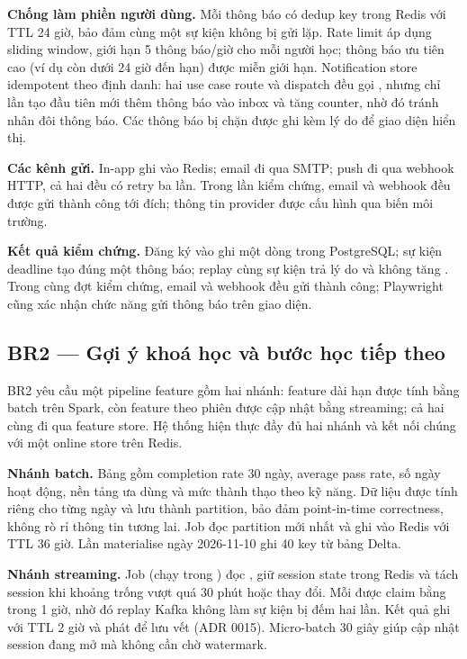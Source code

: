 \textbf{Chống làm phiền người dùng.} Mỗi thông báo có dedup key trong Redis với TTL 24 giờ, bảo đảm cùng một sự kiện không bị gửi lặp. Rate limit áp dụng sliding window, giới hạn 5 thông báo/giờ cho mỗi người học; thông báo ưu tiên cao (ví dụ còn dưới 24 giờ đến hạn) được miễn giới hạn. Notification store idempotent theo định danh: hai use case route và dispatch đều gọi , nhưng chỉ lần tạo đầu tiên mới thêm thông báo vào inbox và tăng counter, nhờ đó tránh nhân đôi thông báo. Các thông báo bị chặn được ghi kèm lý do để giao diện hiển thị.

\textbf{Các kênh gửi.} In-app ghi vào Redis; email đi qua SMTP; push đi qua webhook HTTP, cả hai đều có retry ba lần. Trong lần kiểm chứng, email và webhook đều được gửi thành công tới đích; thông tin provider được cấu hình qua biến môi trường.

\textbf{Kết quả kiểm chứng.} Đăng ký  vào  ghi một dòng trong PostgreSQL; sự kiện deadline tạo đúng một thông báo; replay cùng sự kiện trả lý do  và không tăng . Trong cùng đợt kiểm chứng, email và webhook đều gửi thành công; Playwright cũng xác nhận chức năng gửi thông báo trên giao diện.

\subsection{BR2 --- Gợi ý khoá học và bước học tiếp theo}
\label{sec:br2}

BR2 yêu cầu một pipeline feature gồm hai nhánh: feature dài hạn được tính bằng batch trên Spark, còn feature theo phiên được cập nhật bằng streaming; cả hai cùng đi qua feature store. Hệ thống hiện thực đầy đủ hai nhánh và kết nối chúng với một online store trên Redis.

\textbf{Nhánh batch.} Bảng  gồm completion rate 30 ngày, average pass rate, số ngày hoạt động, nền tảng ưa dùng và mức thành thạo theo kỹ năng. Dữ liệu được tính riêng cho từng ngày và lưu thành partition, bảo đảm point-in-time correctness, không rò rỉ thông tin tương lai. Job  đọc partition mới nhất và ghi  vào Redis với TTL 36 giờ. Lần materialise ngày 2026-11-10 ghi 40 key từ bảng Delta.

\textbf{Nhánh streaming.} Job  (chạy trong ) đọc , giữ session state trong Redis và tách session khi khoảng trống vượt quá 30 phút hoặc  thay đổi. Mỗi  được claim bằng  trong 1 giờ, nhờ đó replay Kafka không làm sự kiện bị đếm hai lần. Kết quả ghi  với TTL 2 giờ và phát  để lưu vết (ADR 0015). Micro-batch 30 giây giúp cập nhật session đang mở mà không cần chờ watermark.

